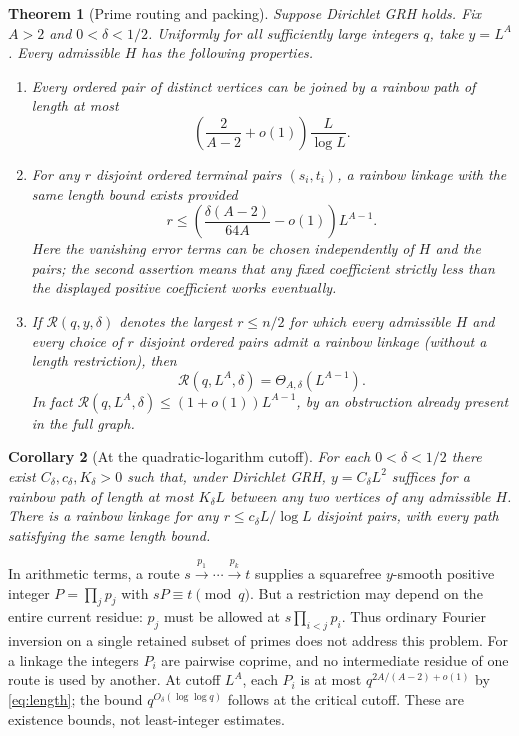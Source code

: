 \documentclass[11pt]{article}
\newtheorem{theorem}{Theorem}[section]
\newtheorem{corollary}[theorem]{Corollary}
\theoremstyle{remark}\newtheorem{remark}[theorem]{Remark}
\begin{document}
\begin{theorem}[Prime routing and packing]\label{thm:main}
Suppose Dirichlet GRH holds. Fix $A>2$ and $0<\delta<1/2$. Uniformly for all sufficiently large integers $q$, take $y=L^A$. Every admissible $H$ has the following properties.
\begin{enumerate}[label=(\roman*)]
\item Every ordered pair of distinct vertices can be joined by a rainbow path of length at most
\begin{equation}\label{eq:length}
 \left(\frac{2}{A-2}+o(1)\right)\frac{L}{\log L}.
\end{equation}
\item For any $r$ disjoint ordered terminal pairs $(s_i,t_i)$, a rainbow linkage with the same length bound exists provided
\begin{equation}\label{eq:capacity}
 r\le\left(\frac{\delta(A-2)}{64A}-o(1)\right)L^{A-1}.
\end{equation}
Here the vanishing error terms can be chosen independently of $H$ and the pairs; the second assertion means that any fixed coefficient strictly less than the displayed positive coefficient works eventually.
\item If $\mathcal R(q,y,\delta)$ denotes the largest $r\le n/2$ for which every admissible $H$ and every choice of $r$ disjoint ordered pairs admit a rainbow linkage (without a length restriction), then
\begin{equation}\label{eq:theta}
 \mathcal R(q,L^A,\delta)=\Theta_{A,\delta}(L^{A-1}).
\end{equation}
In fact $\mathcal R(q,L^A,\delta)\le(1+o(1))L^{A-1}$, by an obstruction already present in the full graph.
\end{enumerate}
\end{theorem}

\begin{corollary}[At the quadratic-logarithm cutoff]\label{cor:critical}
For each $0<\delta<1/2$ there exist $C_\delta,c_\delta,K_\delta>0$ such that, under Dirichlet GRH, $y=C_\delta L^2$ suffices for a rainbow path of length at most $K_\delta L$ between any two vertices of any admissible $H$. There is a rainbow linkage for any $r\le c_\delta L/\log L$ disjoint pairs, with every path satisfying the same length bound.
\end{corollary}

In arithmetic terms, a route $s\xrightarrow{p_1}\cdots\xrightarrow{p_k}t$ supplies a squarefree $y$-smooth positive integer $P=\prod_jp_j$ with $sP\equiv t\pmod q$. But a restriction may depend on the entire current residue: $p_j$ must be allowed at $s\prod_{i<j}p_i$. Thus ordinary Fourier inversion on a single retained subset of primes does not address this problem. For a linkage the integers $P_i$ are pairwise coprime, and no intermediate residue of one route is used by another. At cutoff $L^A$, each $P_i$ is at most $q^{2A/(A-2)+o(1)}$ by \eqref{eq:length}; the bound $q^{O_\delta(\log\log q)}$ follows at the critical cutoff. These are existence bounds, not least-integer estimates.
\end{document}
